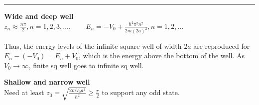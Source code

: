 \medskip
\hrule height 0.3pt \thinspace

\textbf{Wide and deep well} \\

$z_n \approx \frac{n \pi}{2}, n = 1, 2, 3, ..., \qquad E_n = -V_0 + \frac{\hbar^2 \pi^2 n^2}{2m(2a)^2}, n = 1, 2, ...$

Thus, the energy levels of the infinite square well of width $2a$ are reproduced for $E_n - (-V_0) = E_n + V_0$, which is the energy above the bottom of the well. As $V_0 \rightarrow \infty$, finite sq well goes to infinite sq well.




\textbf{Shallow and narrow well} \\
Need at least $z_0 = \sqrt{\frac{2mV_0 a^2}{\hbar^2}} \geq \frac{\pi}{2}$ to support any odd state.


